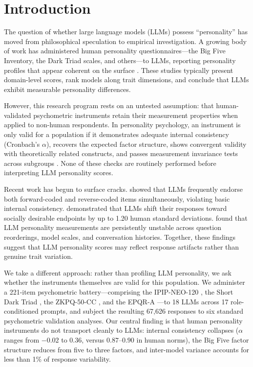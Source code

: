 \section{Introduction}

The question of whether large language models (LLMs) possess ``personality'' has moved from philosophical speculation to empirical investigation. A growing body of work has administered human personality questionnaires---the Big Five Inventory, the Dark Triad scales, and others---to LLMs, reporting personality profiles that appear coherent on the surface \citep{miotto2023gpt3, bhandari2025evaluating, serapio2025psychometric}. These studies typically present domain-level scores, rank models along trait dimensions, and conclude that LLMs exhibit measurable personality differences.

However, this research program rests on an untested assumption: that human-validated psychometric instruments retain their measurement properties when applied to non-human respondents. In personality psychology, an instrument is only valid for a population if it demonstrates adequate internal consistency (Cronbach's $\alpha$), recovers the expected factor structure, shows convergent validity with theoretically related constructs, and passes measurement invariance tests across subgroups \citep{cronbach1951coefficient, lord1968statistical}. None of these checks are routinely performed before interpreting LLM personality scores.

Recent work has begun to surface cracks. \citet{suhr2025challenging} showed that LLMs frequently endorse both forward-coded and reverse-coded items simultaneously, violating basic internal consistency. \citet{acerbi2024llm} demonstrated that LLMs shift their responses toward socially desirable endpoints by up to 1.20 human standard deviations. \citet{pelet2025persistent} found that LLM personality measurements are persistently unstable across question reorderings, model scales, and conversation histories. Together, these findings suggest that LLM personality scores may reflect response artifacts rather than genuine trait variation.

We take a different approach: rather than profiling LLM personality, we ask whether the instruments themselves are valid for this population. We administer a 221-item psychometric battery---comprising the IPIP-NEO-120 \citep{johnson2014measuring}, the Short Dark Triad \citep{jones2014introducing}, the ZKPQ-50-CC \citep{aluja2006cross}, and the EPQR-A \citep{francis1992development}---to 18 LLMs across 17 role-conditioned prompts, and subject the resulting 67,626 responses to six standard psychometric validation analyses. Our central finding is that human personality instruments do not transport cleanly to LLMs: internal consistency collapses ($\alpha$ ranges from $-0.02$ to $0.36$, versus $0.87$--$0.90$ in human norms), the Big Five factor structure reduces from five to three factors, and inter-model variance accounts for less than 1\% of response variability.


